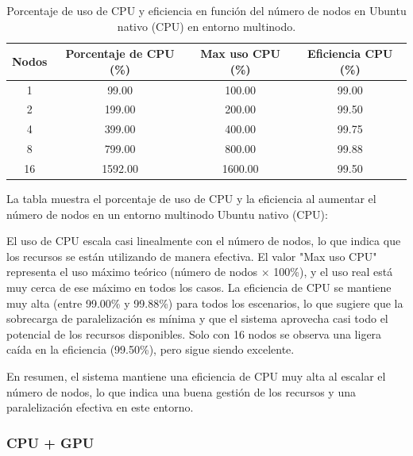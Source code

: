 \begin{table}[ht]
    \centering
    \begin{tabular}{|c|c|c|c|}
        \hline
        \textbf{Nodos} & \textbf{Porcentaje de CPU (\%)} & \textbf{Max uso CPU (\%)} & \textbf{Eficiencia CPU (\%)} \\
        \hline
        1              & 99.00                           & 100.00                    & 99.00                        \\
        2              & 199.00                          & 200.00                    & 99.50                        \\
        4              & 399.00                          & 400.00                    & 99.75                        \\
        8              & 799.00                          & 800.00                    & 99.88                        \\
        16             & 1592.00                         & 1600.00                   & 99.50                        \\
        \hline
    \end{tabular}
    \caption{Porcentaje de uso de CPU y eficiencia en función del número de nodos en Ubuntu nativo (CPU) en entorno multinodo.}
    \label{tab:multi-node_ubuntu_cpu_native_cpu}
\end{table}

La tabla muestra el porcentaje de uso de CPU y la eficiencia al aumentar el número de nodos en un entorno multinodo Ubuntu nativo (CPU):

El uso de CPU escala casi linealmente con el número de nodos, lo que indica que los recursos se están utilizando de manera efectiva. El valor "Max uso CPU" representa el uso máximo teórico (número de nodos $\times$ 100\%), y el uso real está muy cerca de ese máximo en todos los casos. La eficiencia de CPU se mantiene muy alta (entre 99.00\% y 99.88\%) para todos los escenarios, lo que sugiere que la sobrecarga de paralelización es mínima y que el sistema aprovecha casi todo el potencial de los recursos disponibles. Solo con 16 nodos se observa una ligera caída en la eficiencia (99.50\%), pero sigue siendo excelente.

En resumen, el sistema mantiene una eficiencia de CPU muy alta al escalar el número de nodos, lo que indica una buena gestión de los recursos y una paralelización efectiva en este entorno.

\subsubsection{CPU + GPU}

